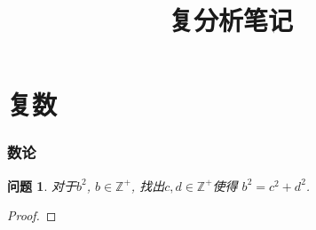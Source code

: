 \documentclass{ctexart}
\title{复分析笔记}
\newtheorem{question}{问题} %
\begin{document}
\tableofcontents 

\part{复数}
\section*{数论}
\begin{question} 对于$b^2$, $b\in \mathbb{Z^{+}}$, 找出$c,d\in \mathbb{Z}^{+}$使得 $b^2=c^2+d^2$. 
 \end{question}
\begin{proof}  \end{proof}
\end{document}
